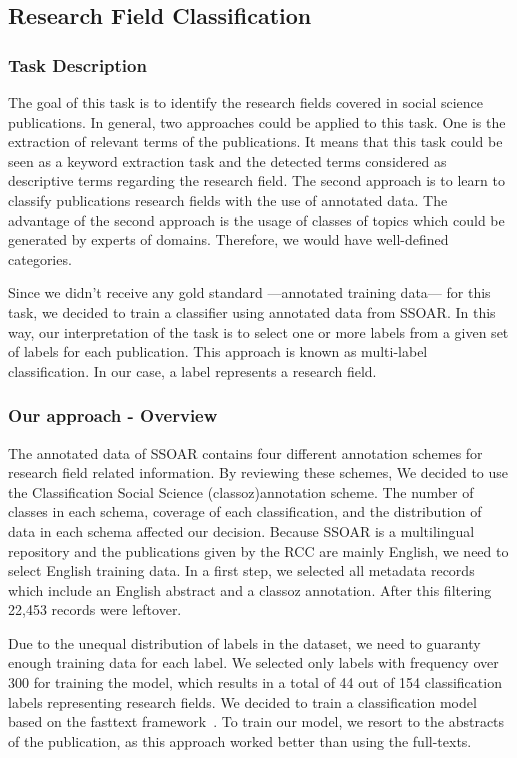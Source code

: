 
\subsection{Research Field Classification}
\label{section:field_classification}
\subsubsection{Task Description}
The goal of this task is to identify the research fields covered in social science publications.
In general, two approaches could be applied to this task. One is the extraction of relevant terms of the publications. It means that this task could be seen as a keyword extraction task and the detected terms considered as descriptive terms regarding the research field. The second approach is to learn to classify publications research fields with the use of annotated data. The advantage of the second approach is the usage of classes of topics which could be generated by experts of domains. Therefore, we would have well-defined categories.

Since we didn't receive any gold standard ---annotated training data--- for this task, we decided to train a classifier using annotated data from SSOAR.
In this way, our interpretation of the task is to select one or more labels from a given set of labels for each publication. This approach is known as multi-label classification. In our case, a label represents a research field.

\subsubsection{Our approach - Overview }
The annotated data of SSOAR contains four different annotation schemes for research field related information. By reviewing these schemes, We decided to use the Classification Social Science (classoz)annotation scheme. The number of classes in each schema, coverage of each classification, and the distribution of data in each schema affected our decision. 
Because SSOAR is a multilingual repository and the publications given by the RCC are mainly English, we need to select English training data.
In a first step, we selected all metadata records which include an English abstract and a classoz annotation. After this filtering 22,453 records were leftover.

Due to the unequal distribution of labels in the dataset, we need to guaranty enough training data for each label.
We selected only labels with frequency over 300 for training the model, which results in a total of 44 out of 154 classification labels representing research fields.
We decided to train a classification model based on the fasttext framework~\cite{joulin2017bag}. To train our model, we resort to the abstracts of the publication, as this approach worked better than using the full-texts.

